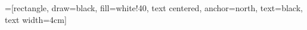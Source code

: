 \documentclass{article}
\begin{document}
=[rectangle, draw=black, fill=white!40,
        text centered, anchor=north, text=black, text width=4cm]

\newcommand{\numofnodes}{2}

\newcommand{\Caption}{Caption Here}

\newcommand{\ObjectName}{LinkedList\textlangle student\textrangle}
\newcommand{\LLHead}{}
\newcommand{\LLTail}{null}
\newcommand{\LLSize}{\numofnodes}

\newcommand{\NName}{Node\textlangle student\textrangle}
\newcommand{\NValue}{}
\newcommand{\NNext}{}
\newcommand{\NPrev}{null}

\newcommand{\VTop}{Student}
\newcommand{\VName}{Jim}
\newcommand{\VNum}{123}
\newcommand{\VAddr}{}

\newcommand{\AName}{Address}
\newcommand{\AStreet}{33 Blank St}
\newcommand{\ACity}{Glassboro}
\newcommand{\AState}{NJ}
\newcommand{\AZip}{08080}

\newcommand{\TName}{Tail}
\newcommand{\THead}{null}
\newcommand{\TTail}{}
\newcommand{\TSize}{null}
\end{document}
